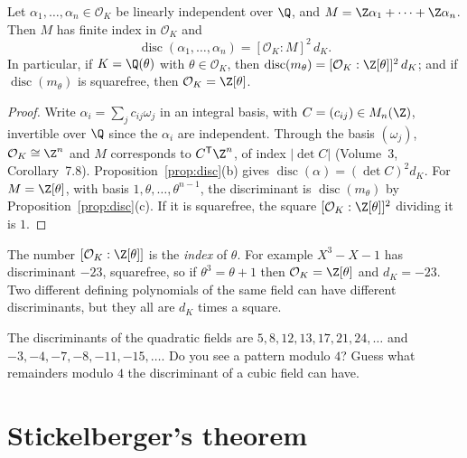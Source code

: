 \begin{proposition}\label{prop:index}
Let $\alpha_1,\dots,\alpha_n\in\mathcal O_K$ be linearly independent over $\Q$, and $M=\Z\alpha_1+\dots+\Z\alpha_n$.
Then $M$ has finite index in $\mathcal O_K$ and
\[
\operatorname{disc}(\alpha_1,\dots,\alpha_n)=[\mathcal O_K:M]^2\,d_K.
\]
In particular, if $K=\Q(\theta)$ with $\theta\in\mathcal O_K$, then $\operatorname{disc}(m_\theta)=
[\mathcal O_K:\Z[\theta]]^2\,d_K$; and if $\operatorname{disc}(m_\theta)$ is squarefree, then
$\mathcal O_K=\Z[\theta]$.
\end{proposition}
\begin{proof}
Write $\alpha_i=\sum_jc_{ij}\omega_j$ in an integral basis, with $C=(c_{ij})\in M_n(\Z)$, invertible over $\Q$ since the
$\alpha_i$ are independent. Through the basis $(\omega_j)$, $\mathcal O_K\cong\Z^n$ and $M$ corresponds to
$C^{\mathsf T}\Z^n$, of index $|\det C|$ (Volume~3, Corollary~7.8). Proposition~\ref{prop:disc}(b) gives
$\operatorname{disc}(\alpha)=(\det C)^2d_K$. For $M=\Z[\theta]$, with basis $1,\theta,\dots,\theta^{n-1}$, the discriminant
is $\operatorname{disc}(m_\theta)$ by Proposition~\ref{prop:disc}(c). If it is squarefree, the square
$[\mathcal O_K:\Z[\theta]]^2$ dividing it is $1$.
\end{proof}

The number $[\mathcal O_K:\Z[\theta]]$ is the \emph{index} of $\theta$. For example $X^3-X-1$ has discriminant $-23$,
squarefree, so if $\theta^3=\theta+1$ then $\mathcal O_K=\Z[\theta]$ and $d_K=-23$. Two different defining polynomials
of the same field can have different discriminants, but they all are $d_K$ times a square.

\begin{think}
The discriminants of the quadratic fields are $5, 8, 12, 13, 17, 21, 24, \dots$ and $-3,-4,-7,-8,-11,-15,\dots$. Do you
see a pattern modulo $4$? Guess what remainders modulo $4$ the discriminant of a cubic field can have.
\end{think}

\section{Stickelberger's theorem}


